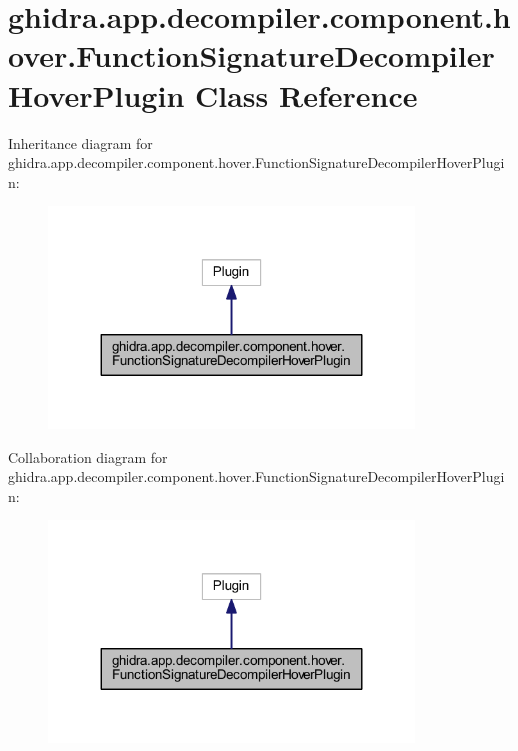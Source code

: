 \hypertarget{classghidra_1_1app_1_1decompiler_1_1component_1_1hover_1_1_function_signature_decompiler_hover_plugin}{}\section{ghidra.\+app.\+decompiler.\+component.\+hover.\+Function\+Signature\+Decompiler\+Hover\+Plugin Class Reference}
\label{classghidra_1_1app_1_1decompiler_1_1component_1_1hover_1_1_function_signature_decompiler_hover_plugin}


Inheritance diagram for ghidra.\+app.\+decompiler.\+component.\+hover.\+Function\+Signature\+Decompiler\+Hover\+Plugin\+:
\nopagebreak
\begin{figure}[H]
\begin{center}
\leavevmode
\includegraphics[width=275pt]{classghidra_1_1app_1_1decompiler_1_1component_1_1hover_1_1_function_signature_decompiler_hover_plugin__inherit__graph}
\end{center}
\end{figure}


Collaboration diagram for ghidra.\+app.\+decompiler.\+component.\+hover.\+Function\+Signature\+Decompiler\+Hover\+Plugin\+:
\nopagebreak
\begin{figure}[H]
\begin{center}
\leavevmode
\includegraphics[width=275pt]{classghidra_1_1app_1_1decompiler_1_1component_1_1hover_1_1_function_signature_decompiler_hover_plugin__coll__graph}
\end{center}
\end{figure}
